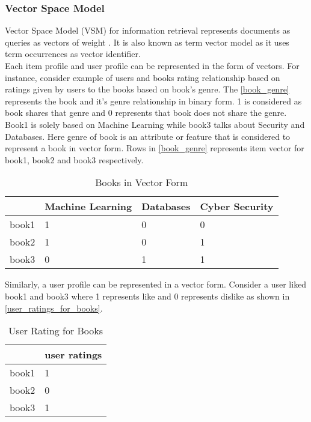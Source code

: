 \subsubsection{Vector Space Model}
\label{vector_space_model}
Vector Space Model (VSM) for information retrieval represents documents as queries as vectors of weight \cite{46}. It is also known as term vector model as it uses term occurrences as vector identifier. 
\\
Each item profile and user profile can be represented in the form of vectors. For instance, consider example of users and books rating relationship based on ratings given by users to the books based on book's genre. The \autoref{book_genre} represents the book and it's genre relationship in binary form. 1 is considered as book shares that genre and 0 represents that book does not share the genre. Book1 is solely based on Machine Learning while book3 talks about Security and Databases. Here genre of book is an attribute or feature that is considered to represent a book in vector form. Rows in \autoref{book_genre} represents item vector for book1, book2 and book3 respectively.   

\begin{table}[]
\centering

\begin{tabular}{|l|l|l|l|}
\hline
      & Machine Learning & Databases & Cyber Security \\ \hline
book1 & 1                & 0         & 0              \\ \hline
book2 & 1                & 0         & 1              \\ \hline
book3 & 0                & 1         & 1              \\ \hline
\end{tabular}
\caption{Books in Vector Form}

\label{book_genre}
\end{table} 

\noindent
Similarly, a user profile can be represented in a vector form. Consider a user liked book1 and book3 where 1 represents like and 0 represents dislike as shown in \autoref{user_ratings_for_books}. 

\begin{table}[]
\centering
\begin{tabular}{|l|l|}
\hline
      & user ratings \\ \hline
book1 & 1            \\ \hline
book2 & 0            \\ \hline
book3 & 1            \\ \hline
\end{tabular}
\caption{User Rating for Books}
\label{user_ratings_for_books}
\end{table}

